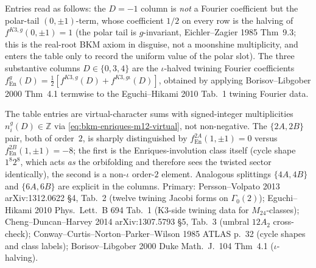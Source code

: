 \begin{theorem}
\begin{center}
\begin{tabular}{l|r|r|r|r|l}
\bottomrule
\end{tabular}
\end{center}
Entries read as follows: the $D = -1$ column is \emph{not} a Fourier
coefficient but the polar-tail $(0,\pm 1)$-term, whose coefficient
$1/2$ on every row is the halving of $f^{K3,g}(0,\pm 1) = 1$ (the
polar tail is $g$-invariant, Eichler--Zagier 1985 Thm~9.3; this is the
real-root BKM axiom in disguise, not a moonshine multiplicity, and
enters the table only to record the uniform value of the
polar slot). The three substantive columns $D\in\{0, 3, 4\}$ are the
$\iota$-halved twining Fourier coefficients $f^g_{\mathrm{En}}(D) =
\tfrac{1}{2}[f^{K3,g}(D) + f^{K3,g\iota}(D)]$, obtained by applying
Borisov--Libgober 2000 Thm~4.1 termwise to the Eguchi--Hikami 2010
Tab.~1 twining Fourier data.

The table entries are virtual-character sums with signed-integer
multiplicities $n^g_i(D)\in\mathbb{Z}$ via
\eqref{eq:bkm-enriques-m12-virtual}, not non-negative. The
$\{2A,2B\}$ pair, both of order~$2$, is sharply distinguished by
$f^{2A}_{\mathrm{En}}(1,\pm 1) = 0$ versus
$f^{2B}_{\mathrm{En}}(1,\pm 1) = -8$; the first is the
Enriques-involution class itself (cycle shape $1^8 2^8$, which acts
\emph{as} the orbifolding and therefore sees the twisted sector
identically), the second is a non-$\iota$ order-$2$ element.
Analogous splittings $\{4A, 4B\}$ and $\{6A, 6B\}$ are explicit in the
columns.
Primary:
Persson--Volpato 2013 arXiv:1312.0622 \S 4, Tab.~2
(twelve twining Jacobi forms on $\Gamma_0(2)$);
Eguchi--Hikami 2010 Phys.\ Lett.\ B 694 Tab.~1 (K3-side twining data
for $M_{24}$-classes);
Cheng--Duncan--Harvey 2014 arXiv:1307.5793 \S 5, Tab.~3 (umbral
$12A_2$ cross-check);
Conway--Curtis--Norton--Parker--Wilson 1985 ATLAS p.~32
(cycle shapes and class labels);
Borisov--Libgober 2000 Duke Math.\ J.\ 104 Thm~4.1 ($\iota$-halving).
\end{theorem}

